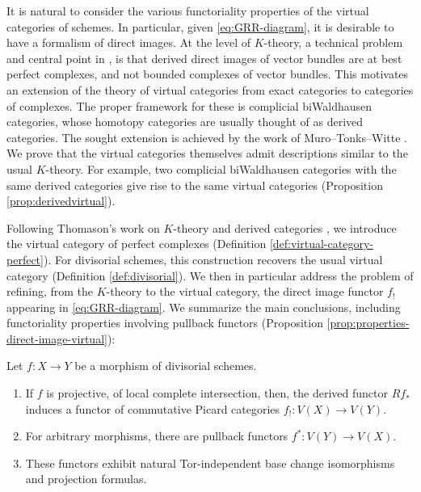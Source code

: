 It is natural to consider the various functoriality properties of the virtual categories of schemes. In particular, given \eqref{eq:GRR-diagram}, it is desirable to have a formalism of direct images. At the level of $K$-theory, a technical problem and central point in \cite{SGA6}, is that derived direct images of vector bundles are at best perfect complexes, and not bounded complexes of vector bundles. This motivates an extension of the theory of virtual categories from exact categories to categories of complexes. The proper framework for these is complicial biWaldhausen categories, whose homotopy categories are usually thought of as derived categories. The sought extension is achieved by the work of Muro--Tonks--Witte \cite{Muro:determinant}. We prove that the virtual categories themselves admit descriptions similar to the usual $K$-theory. For example, two complicial biWaldhausen categories with the same derived categories give rise to the same virtual categories (\cf Proposition \ref{prop:derivedvirtual}).

Following Thomason's work on $K$-theory and derived categories \cite{ThomasonTrobaugh}, we introduce the virtual category of perfect complexes (\cf Definition \ref{def:virtual-category-perfect}). For divisorial schemes, this construction recovers the usual virtual category (\cf Definition \ref{def:divisorial}). We then in particular address the problem of refining, from the $K$-theory to the virtual category, the direct image functor $f_{!}$ appearing in \eqref{eq:GRR-diagram}. We summarize the main conclusions, including functoriality properties involving pullback functors (\cf Proposition \ref{prop:properties-direct-image-virtual}):
\begin{prop}\label{prop:intro-direct}
Let $f\colon X\to Y$ be a morphism of divisorial schemes.

\begin{enumerate}
\item If $f$ is projective, of local complete intersection, then, the derived functor $Rf_{\ast}$ induces a functor of commutative Picard categories $f_{!}\colon V(X)\to V(Y)$.

\item For arbitrary morphisms, there are pullback functors $f^\ast \colon V(Y) \to V(X)$.

\item These functors exhibit natural Tor-independent base change isomorphisms and projection formulas.
\end{enumerate}
\end{prop}

